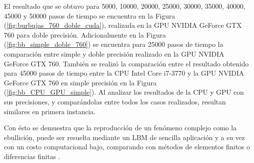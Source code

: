El resultado que se obtuvo para 5000, 10000, 20000, 25000, 30000, 35000, 40000, 45000 y 50000 pasos de tiempo se encuentra en la Figura (\ref{fig:burbujas_760_doble_cuda}), realizada en la GPU NVIDIA GeForce GTX 760 para doble precisión. Adicionalmente en la Figura (\ref{fig:bb_simple_doble_760}) se encuentra para 25000 pasos de tiempo la comparación entre simple y doble precisión realizado en la GPU NVIDIA GeForce GTX 760. También se realizó la comparación entre el resultado obtenido para 45000 pasos de tiempo entre la CPU Intel Core i7-3770 y la GPU NVIDIA GeForce GTX 760 en simple precisión  en la Figura (\ref{fig:bb_CPU_GPU_simple}). Al analizar los resultados de la CPU y GPU con sus precisiones, y comparándolas entre todos los casos realizados, resultan similares en primera instancia.

Con ésto se demuestra que la reproducción de un fenómeno complejo como la ebullición, puede ser resuelta mediante un LBM de sencilla aplicación y a su vez con un costo computacional bajo, comparando con métodos de elementos finitos o diferencias finitas \cite{guo2013lattice}.




\iffalse

